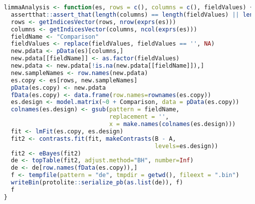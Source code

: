 \begin{lstlisting}[float=!h,caption={Реализация дифференциальной экспрессии в R-пакете phantasus},label={limmaAnalysis},language=R]
limmaAnalysis <- function(es, rows = c(), columns = c(), fieldValues) {
  assertthat::assert_that(length(columns) == length(fieldValues) || length(columns) == 0)
  rows <- getIndicesVector(rows, nrow(exprs(es)))
  columns <- getIndicesVector(columns, ncol(exprs(es)))
  fieldName <- "Comparison"
  fieldValues <- replace(fieldValues, fieldValues == '', NA)
  new.pdata <- pData(es)[columns,]
  new.pdata[[fieldName]] <- as.factor(fieldValues)
  new.pdata <- new.pdata[!is.na(new.pdata[[fieldName]]),]
  new.sampleNames <- row.names(new.pdata)
  es.copy <- es[rows, new.sampleNames]
  pData(es.copy) <- new.pdata
  fData(es.copy) <- data.frame(row.names=rownames(es.copy))
  es.design <- model.matrix(~0 + Comparison, data = pData(es.copy))
  colnames(es.design) <- gsub(pattern = fieldName,
                              replacement = '',
                              x = make.names(colnames(es.design)))
  fit <- lmFit(es.copy, es.design)
  fit2 <- contrasts.fit(fit, makeContrasts(B - A,
                                           levels=es.design))
  fit2 <- eBayes(fit2)
  de <- topTable(fit2, adjust.method="BH", number=Inf)
  de <- de[row.names(fData(es.copy)),]
  f <- tempfile(pattern = "de", tmpdir = getwd(), fileext = ".bin")
  writeBin(protolite::serialize_pb(as.list(de)), f)
  f
}
\end{lstlisting}

